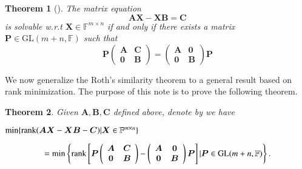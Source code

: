 \documentclass{baustms}
\theoremstyle{cupthm}
\newtheorem{thm}{Theorem}[section]
\theoremstyle{cupdefn}
\theoremstyle{cuprem}
\numberwithin{equation}{section}
\begin{document}

\begin{thm}[\cite{Roth}] The matrix equation 
\begin{equation}
\label{e1}
\bm{A}\bm{X}-\bm{X}\bm{B}=\bm{C}
\end{equation}
is solvable w.r.t $\bm{X}\in\mathbb{F}^{m\times n}$ if and only if there exists a matrix $\bm{P}\in\text{GL}(m+n,\mathbb{F})$ such that 
\[
\bm{P}
\left(
\begin{array}{cc}
\bm{A} & \bm{C} \\
\bm{0} & \bm{B}
\end{array}
\right)
=
\left(
\begin{array}{cc}
\bm{A} & \bm{0} \\
\bm{0} & \bm{B}
\end{array}
\right)
\bm{P}
\]
\end{thm}
We now generalize the Roth's similarity theorem to a general result based on rank minimization. The purpose of this note is to prove the following theorem.
\begin{thm} Given $\bm{A},\bm{B},\bm{C}$ defined above, denote by we have
\\
\centerline{
$
\min
\{
\textnormal{rank}
(\bm{A}\bm{X}-\bm{X}\bm{B}-\bm{C})
|
\bm{X}\in\mathbb{F}^{m\times n}
\}
$
}
\[
=
\min
\left\{
\textnormal{rank}
\left[
\bm{P}
\left(
\begin{array}{cc}
\bm{A} & \bm{C} \\
\bm{0} & \bm{B}
\end{array}
\right)
-
\left(
\begin{array}{cc}
\bm{A} & \bm{0} \\
\bm{0} & \bm{B}
\end{array}
\right)
\bm{P}
\right]
|
\bm{P}
\in
\textnormal{GL}(m+n,\mathbb{F})
\right\}
.
\]
\end{thm}
\end{document}
